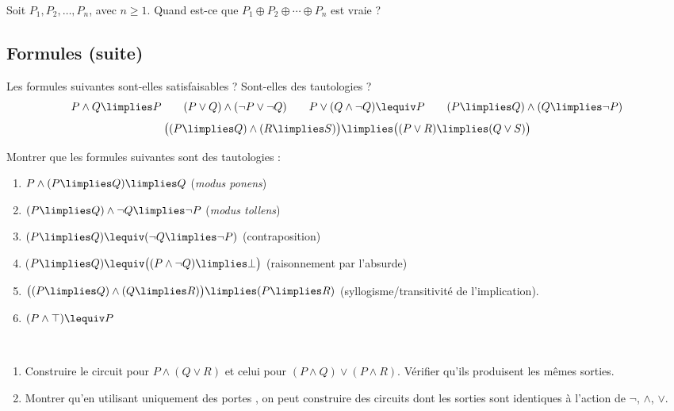 \documentclass[11pt,class=report,crop=false]{standalone}
\begin{document}
\begin{exercicecours}
	Soit $P_1,P_2,\ldots,P_n$, avec $n \ge 1$.
	Quand est-ce que $P_1 \oplus P_2 \oplus \cdots \oplus P_n$ est vraie ?
\end{exercicecours}


\subsection*{Formules (suite)}

\begin{exercicecours}
	Les formules suivantes sont-elles satisfaisables ? Sont-elles des tautologies ?
	\[
	P \land Q \limplies P \qquad
	(P \lor Q) \land (\lnot P \lor \lnot Q) \qquad
	P \lor (Q  \land \lnot Q) \lequiv P \qquad
	(P \limplies Q) \land (Q \limplies \lnot P)
	\]
	\[
	\big( (P \limplies Q) \land (R \limplies S) \big) \limplies \big( (P \lor R) \limplies (Q \lor S) \big)
	\]
\end{exercicecours}

\begin{exercicecours}
	Montrer que les formules suivantes sont des tautologies :
	\begin{enumerate}
		
		\item $P \land (P \limplies Q) \limplies Q$ (\emph{modus ponens})
		
		\item $(P \limplies Q) \land \lnot Q \limplies \lnot P$ (\emph{modus tollens})
		
		\item $(P \limplies Q) \lequiv (\lnot Q \limplies \lnot P)$ (contraposition)
		
		\item ($P \limplies Q) \lequiv \big( (P \land \lnot Q) \limplies \bot \big)$ (raisonnement par l’absurde)
		
		\item $\big((P \limplies Q) \land (Q \limplies R)\big) \limplies (P \limplies R)$ (syllogisme/transitivité de l’implication).
		
		\item $(P \land \top) \lequiv P$
	\end{enumerate}
\end{exercicecours}

\begin{exercicecours}
	~
	\begin{enumerate}
		\item Construire le circuit pour $P \land (Q \lor R)$ et celui pour $(P \land Q) \lor (P \land R)$. Vérifier qu'ils produisent les mêmes sorties.
		
		\item Montrer qu'en utilisant uniquement des portes , on peut construire des circuits dont les sorties sont identiques à l'action de $\lnot$, $\land$, $\lor$.
	\end{enumerate}
\end{exercicecours}
\end{document}
